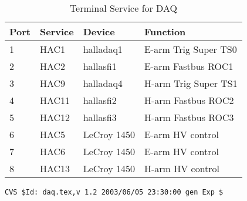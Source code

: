 \begin{table}\centering
\caption[Data Acquisition: Terminal Service for DAQ]{Terminal Service for DAQ}
\begin{tabular}{|l|l|l|l|}  \hline
Port  &   Service & Device & Function\\ \hline
 1    &   HAC1    & halladaq1  & E-arm Trig Super TS0\\
 2    &   HAC2    & hallasfi1  & E-arm Fastbus ROC1\\
 3    &   HAC9    & halladaq4 & H-arm Trig Super TS1 \\
 4    &   HAC11   & hallasfi2  & H-arm Fastbus ROC2\\
 5    &   HAC12   & hallasfi3  & H-arm Fastbus ROC3\\
 6    &   HAC5    & LeCroy 1450 & E-arm HV control\\
 7    &   HAC6    & LeCroy 1450 & E-arm HV control\\
 8    &   HAC13   & LeCroy 1450  & H-arm HV control\\
\hline
\end{tabular}
\end{table}




 
%
%
{\small
\begin{verbatim}CVS $Id: daq.tex,v 1.2 2003/06/05 23:30:00 gen Exp $\end{verbatim}
}
